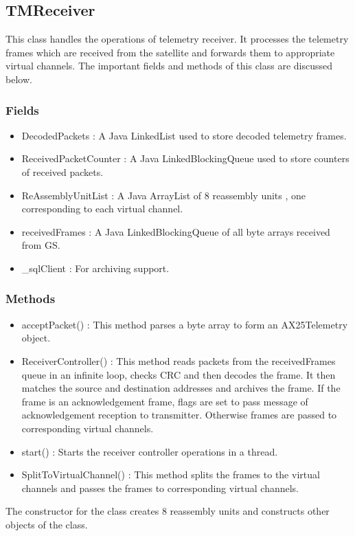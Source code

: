 \documentclass[BTech]{iitmdiss}
\begin{document}
\subsection{TMReceiver}
This class handles the operations of telemetry receiver. It processes the telemetry frames which are received from the satellite and forwards them to appropriate virtual channels. The important fields and methods of this class are discussed below.
\subsubsection{Fields}
\begin{itemize}
\item DecodedPackets : A Java LinkedList used to store decoded telemetry frames.
\item ReceivedPacketCounter : A Java LinkedBlockingQueue used to store counters of received packets.
\item ReAssemblyUnitList : A Java ArrayList of 8 reassembly units , one corresponding to each virtual channel. 
\item receivedFrames : A Java LinkedBlockingQueue of all byte arrays received from GS. 
\item \_sqlClient : For archiving support.
\end{itemize}

\subsubsection{Methods}
\begin{itemize}
\item acceptPacket() : This method parses a byte array to form an AX25Telemetry object.
\item ReceiverController() : This method reads packets from the receivedFrames queue in an infinite loop, checks CRC and then decodes the frame. It then matches the source and destination addresses and archives the frame. If the frame is an acknowledgement frame, flags are set to pass message of acknowledgement reception to transmitter. Otherwise  frames are passed to corresponding virtual channels.
\item start() : Starts the receiver controller operations in a thread.
\item SplitToVirtualChannel() : This method splits the frames to the virtual channels and passes the frames to corresponding virtual channels.  
\end{itemize}
The constructor for the class creates 8 reassembly units and constructs other objects of the class.
\end{document}
